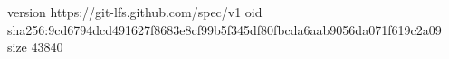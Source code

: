 version https://git-lfs.github.com/spec/v1
oid sha256:9cd6794dcd491627f8683e8cf99b5f345df80fbcda6aab9056da071f619c2a09
size 43840
